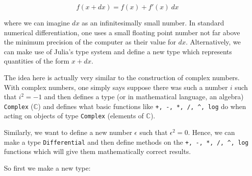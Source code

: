 \documentclass[11pt]{article}
\begin{document}
\[
f(x +  dx) = f(x) + f'(x) ~ dx
\]

where we can imagine \(dx\) as an infinitesimally small number. In
standard numerical differentiation, one uses a small floating point
number not far above the minimum precision of the computer as their
value for \(dx\). Alternatively, we can make use of Julia's type system
and define a new type which represents quantities of the form
\(x + dx\).

The idea here is actually very similar to the construction of complex
numbers. With complex numbers, one simply says suppose there was such a
number \(i\) such that \(i^2 = -1\) and then defines a type (or in
mathematical language, an algebra) \texttt{Complex} (\(\mathbb{C}\)) and
defines what basic functions like \texttt{+,\ -,\ *,\ /,\ \^{},\ log} do
when acting on objects of type \texttt{Complex} (elements of
\(\mathbb{C}\)).

Similarly, we want to define a new number \(\epsilon\) such that
\(\epsilon^2 = 0\). Hence, we can make a type \texttt{Differential} and
then define methods on the \texttt{+,\ -,\ *,\ /,\ \^{},\ log} functions
which will give them mathematically correct results.

So first we make a new type:
\end{document}
